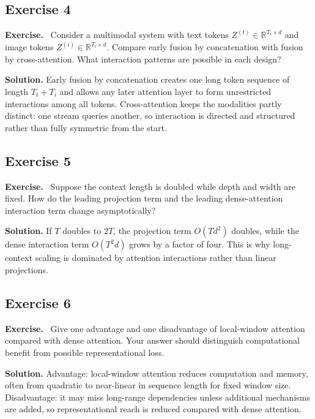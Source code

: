 \documentclass[11pt]{article}
\newenvironment{exercisebox}{\begin{framed}\noindent\textbf{Exercise.}\ }{\end{framed}}
\begin{document}
\subsection*{Exercise 4}
\begin{exercisebox}
Consider a multimodal system with text tokens \(Z^{(t)} \in \mathbb{R}^{T_t \times d}\) and image tokens \(Z^{(i)} \in \mathbb{R}^{T_i \times d}\).
    Compare early fusion by concatenation with fusion by cross-attention.
    What interaction patterns are possible in each design?
\end{exercisebox}
\textbf{Solution.} Early fusion by concatenation creates one long token sequence of length $T_t+T_i$ and allows any later attention layer to form unrestricted interactions among all tokens. Cross-attention keeps the modalities partly distinct: one stream queries another, so interaction is directed and structured rather than fully symmetric from the start.

\subsection*{Exercise 5}
\begin{exercisebox}
Suppose the context length is doubled while depth and width are fixed.
    How do the leading projection term and the leading dense-attention interaction term change asymptotically?
\end{exercisebox}
\textbf{Solution.} If $T$ doubles to $2T$, the projection term $O(Td^2)$ doubles, while the dense interaction term $O(T^2d)$ grows by a factor of four. This is why long-context scaling is dominated by attention interactions rather than linear projections.

\subsection*{Exercise 6}
\begin{exercisebox}
Give one advantage and one disadvantage of local-window attention compared with dense attention.
    Your answer should distinguish computational benefit from possible representational loss.
\end{exercisebox}
\textbf{Solution.} Advantage: local-window attention reduces computation and memory, often from quadratic to near-linear in sequence length for fixed window size. Disadvantage: it may miss long-range dependencies unless additional mechanisms are added, so representational reach is reduced compared with dense attention.
\end{document}
